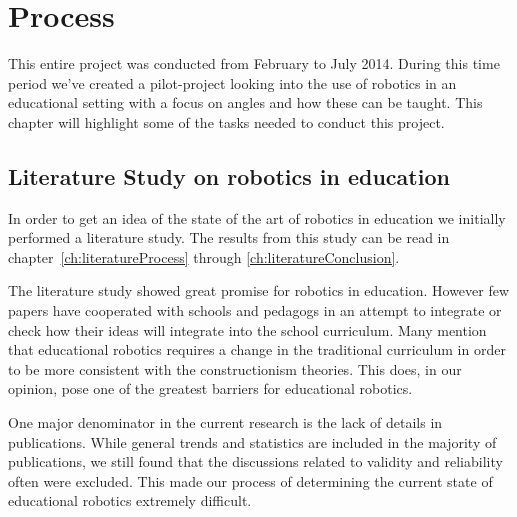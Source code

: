 \chapter{Process}
This entire project was conducted from February to July 2014. During this time period we've created a pilot-project looking into the use of robotics in an educational setting with a focus on angles and how these can be taught.
This chapter will highlight some of the tasks needed to conduct this project. 

\section{Literature Study on robotics in education}
In order to get an idea of the state of the art of robotics in education we initially performed a literature study. The results from this study can be read in chapter~\ref{ch:literatureProcess} through \ref{ch:literatureConclusion}.

\bigskip\noindent
The literature study showed great promise for robotics in education. However few papers have cooperated with schools and pedagogs in an attempt to integrate or check how their ideas will integrate into the school curriculum. Many mention that educational robotics requires a change in the traditional curriculum in order to be more consistent with the constructionism theories. This does, in our opinion, pose one of the greatest barriers for educational robotics.

\bigskip\noindent
One major denominator in the current research is the lack of details in publications. While general trends and statistics are included in the majority of publications, we still found that the discussions related to validity and reliability often were excluded. This made our process of determining the current state of educational robotics extremely difficult. 


